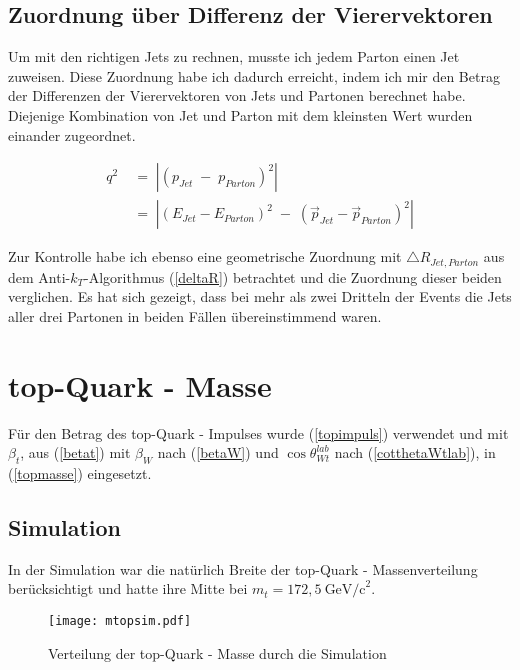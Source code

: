 \documentclass[
a4paper,                                %
twoside,                                %
BCOR1.4cm,                      %
ngerman,                                %
10pt,                           %
headings=normal,                %
headsepline,                    %
clearplainpage, %
final,                                  %
div=14,
parskip=full
]{scrbook}
\begin{document}
\subsection{Zuordnung \"uber Differenz der Vierervektoren}

Um mit den richtigen Jets zu rechnen, musste ich jedem Parton einen Jet zuweisen. Diese Zuordnung habe ich dadurch erreicht, indem ich mir den Betrag der Differenzen der Vierervektoren von Jets und Partonen berechnet habe. Diejenige Kombination von Jet und Parton mit dem kleinsten Wert wurden einander zugeordnet.

\begin{align}
	q^{2}
\;&=\;
	|\left(p_{Jet}\;-\;p_{Parton}\right)^{2}|
\nonumber
\\
\;&=\;
	|\left(E_{Jet} - E_{Parton}\right)^{2}
	\;-\;\left(\vec{p}_{Jet} - \vec{p}_{Parton}\right)^{2}|
\end{align} 

Zur Kontrolle habe ich ebenso eine geometrische Zuordnung mit $ \bigtriangleup R_{Jet, Parton} $ aus dem Anti-$ k_{T} $-Algorithmus (\ref{deltaR}) betrachtet und die Zuordnung dieser beiden verglichen. Es hat sich gezeigt, dass bei mehr als zwei Dritteln der Events die Jets aller drei Partonen in beiden F\"allen \"ubereinstimmend waren.

\newpage

\section{top-Quark - Masse}

F\"ur den Betrag des top-Quark - Impulses wurde (\ref{topimpuls}) verwendet und mit $ \beta_{t} $, aus (\ref{betat}) mit $ \beta_{W} $ nach (\ref{betaW}) und $ \cos \theta_{Wt}^{lab} $ nach (\ref{cotthetaWtlab}), in (\ref{topmasse}) eingesetzt.

\subsection{Simulation}

In der Simulation war die nat\"urlich Breite der top-Quark - Massenverteilung ber\"ucksichtigt und hatte ihre Mitte bei $ m_{t} = 172,5\ \text{GeV}\text{/c}^{2} $.

\begin{figure}[h]
	\centering
	\texttt{[image: mtopsim.pdf]}
	\caption{Verteilung der top-Quark - Masse durch die Simulation}
\end{figure}
\end{document}
